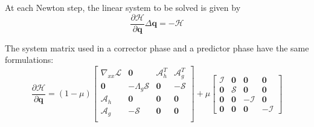 \documentclass{article}
\theoremstyle{definition}
\begin{document}
At each Newton step, the linear system to be solved is given by
\begin{equation}\label{eq:cor}
\frac{\partial \mathcal{H}}{\partial \boldsymbol{q}} \Delta \boldsymbol{q} = -\mathcal{H} 
\end{equation}

The system matrix used in a corrector phase and a predictor phase have the same formulations:
\begin{equation}\label{eq:dHdq}
\frac{\partial \mathcal{H}}{\partial \boldsymbol{q}} = (1-\mu)\begin{bmatrix}
 \nabla_{xx} \mathcal{L}   & \boldsymbol{0} & \mathcal{A}^T_h   & \mathcal{A}^T_g   \\
\boldsymbol{0}     &  - \Lambda_g \mathcal{S}   & \boldsymbol{0} & -\mathcal{S}     \\
\mathcal{A}_h  &  \boldsymbol{0}   & \boldsymbol{0} &  \boldsymbol{0}  \\
\mathcal{A}_g  & -\mathcal{S}  &  \boldsymbol{0}  & \boldsymbol{0}   \\
\end{bmatrix}
+ \mu \begin{bmatrix}
\mathcal{I} & \boldsymbol{0} & \boldsymbol{0} & \boldsymbol{0} \\
\boldsymbol{0}  & \mathcal{S}  & \boldsymbol{0} & \boldsymbol{0} \\
\boldsymbol{0} & \boldsymbol{0} & -\mathcal{I} &  \boldsymbol{0} \\
\boldsymbol{0} & \boldsymbol{0} &   \boldsymbol{0} & -\mathcal{I} 
\end{bmatrix}
\end{equation}
\end{document}
